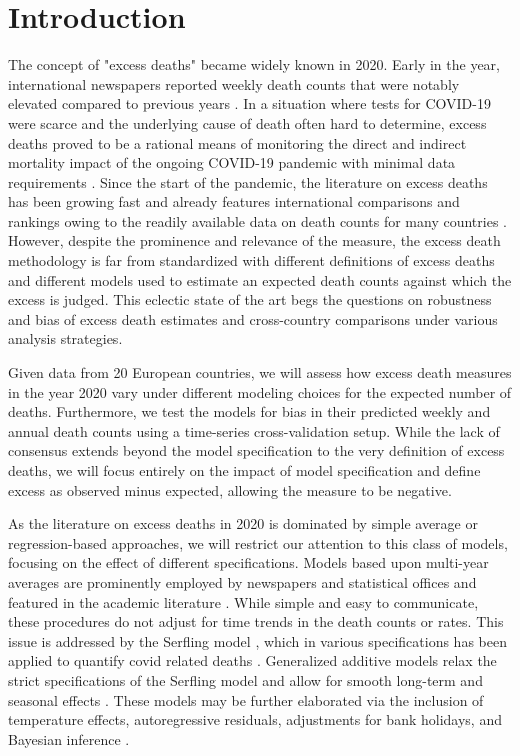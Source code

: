 \documentclass[12pt]{article}
\begin{document}

\section*{Introduction}

The concept of "excess deaths" became widely known in 2020. Early in the year, international newspapers reported weekly death counts that were notably elevated compared to previous years \citep{EDT2020, NYT2020}. In a situation where tests for COVID-19 were scarce and the underlying cause of death often hard to determine, excess deaths proved to be a rational means of monitoring the direct and indirect mortality impact of the ongoing COVID-19 pandemic with minimal data requirements \citep{Leon2020}.
Since the start of the pandemic, the literature on excess deaths has been growing fast and already features international comparisons and rankings owing to the readily available data on death counts for many countries \citep{Kontis2020, Arolas2021, Rizzi2021, Bilinski2020}.
However, despite the prominence and relevance of the measure, the excess death methodology is far from standardized with different definitions of excess deaths and different models used to estimate an expected death counts against which the excess is judged. This eclectic state of the art begs the questions on robustness and bias of excess death estimates and cross-country comparisons under various analysis strategies.

Given data from 20 European countries, we will assess how excess death measures in the year 2020 vary under different modeling choices for the expected number of deaths. Furthermore, we test the models for bias in their predicted weekly and annual death counts using a time-series cross-validation setup. While the lack of consensus extends beyond the model specification to the very definition of excess deaths, we will focus entirely on the impact of model specification and define excess as observed minus expected, allowing the measure to be negative.

As the literature on excess deaths in 2020 is dominated by simple average or regression-based approaches, we will restrict our attention to this class of models, focusing on the effect of different specifications. Models based upon multi-year averages are prominently employed by newspapers and statistical offices and featured in the academic literature \citep{Campbell2021, Magnani2020, Michelozzi2020, Modig2020}. While simple and easy to communicate, these procedures do not adjust for time trends in the death counts or rates. This issue is addressed by the Serfling model \citep{Serfling1963}, which in various specifications has been applied to quantify covid related deaths
\citep{Barnard2020, Weinberger2020, Woolf2020, EuroMoMo2020, Arolas2021}.
Generalized additive models relax the strict specifications of the Serfling model and allow for smooth long-term and seasonal effects \citep{Aburto2021, Scortichini2020}. These models may be further elaborated via the inclusion of temperature effects, autoregressive residuals, adjustments for bank holidays, and Bayesian inference \citep{Kontis2020}.
\end{document}
